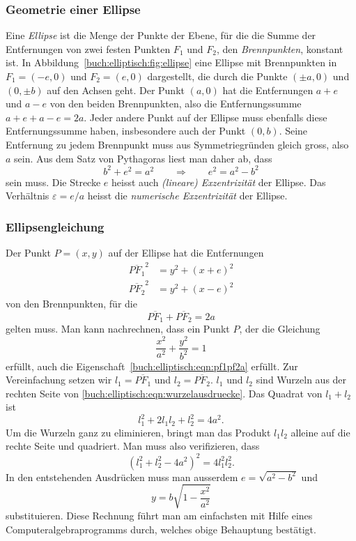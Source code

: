 \subsubsection{Geometrie einer Ellipse}
Eine {\em Ellipse} ist die Menge der Punkte der Ebene, für die die Summe
%
der Entfernungen von zwei festen Punkten $F_1$ und $F_2$,
den {\em Brennpunkten}, konstant ist.
%
In Abbildung~\ref{buch:elliptisch:fig:ellipse} eine Ellipse
mit Brennpunkten in $F_1=(-e,0)$ und $F_2=(e,0)$ dargestellt,
die durch die Punkte $(\pm a,0)$ und $(0,\pm b)$ auf den Achsen geht.
Der Punkt $(a,0)$ hat die Entfernungen $a+e$ und $a-e$ von den beiden
Brennpunkten, also die Entfernungssumme $a+e+a-e=2a$.
Jeder andere Punkt auf der Ellipse muss ebenfalls diese Entfernungssumme
haben, insbesondere auch der Punkt $(0,b)$.
Seine Entfernung zu jedem Brennpunkt muss aus Symmetriegründen gleich gross,
also $a$ sein.
Aus dem Satz von Pythagoras liest man daher ab, dass
\[
b^2+e^2=a^2
\qquad\Rightarrow\qquad
e^2 = a^2-b^2
\]
sein muss.
Die Strecke $e$ heisst auch {\em (lineare) Exzentrizität} der Ellipse.
Das Verhältnis $\varepsilon= e/a$  heisst die {\em numerische Exzentrizität}
der Ellipse.

\subsubsection{Ellipsengleichung}
Der Punkt $P=(x,y)$ auf der Ellipse hat die Entfernungen
\begin{equation}
\begin{aligned}
\overline{PF_1}^2
&=
y^2 + (x+e)^2
\\
\overline{PF_2}^2
&=
y^2 + (x-e)^2
\end{aligned}
\label{buch:elliptisch:eqn:wurzelausdruecke}
\end{equation}
von den Brennpunkten, für die 
\begin{equation}
\overline{PF_1}+\overline{PF_2}
=
2a
\label{buch:elliptisch:eqn:pf1pf2a}
\end{equation}
gelten muss.
Man kann nachrechnen, dass ein Punkt $P$, der die Gleichung
\[
\frac{x^2}{a^2} + \frac{y^2}{b^2}=1
\]
erfüllt, auch die Eigenschaft~\eqref{buch:elliptisch:eqn:pf1pf2a}
erfüllt.
Zur Vereinfachung setzen wir $l_1=\overline{PF_1}$ und $l_2=\overline{PF_2}$.
$l_1$ und $l_2$ sind Wurzeln aus der rechten Seite von
\eqref{buch:elliptisch:eqn:wurzelausdruecke}.
Das Quadrat von $l_1+l_2$ ist
\[
l_1^2 + 2l_1l_2 + l_2^2 = 4a^2.
\]
Um die Wurzeln ganz zu eliminieren, bringt man das Produkt $l_1l_2$ alleine
auf die rechte Seite und quadriert.
Man muss also verifizieren, dass
\[
(l_1^2 + l_2^2 -4a^2)^2 = 4l_1^2l_2^2.
\]
In den entstehenden Ausdrücken muss man ausserdem $e=\sqrt{a^2-b^2}$ und
\[
y=b\sqrt{1-\frac{x^2}{a^2}}
\]
substituieren.
Diese Rechnung führt man am einfachsten mit Hilfe eines
Computeralgebraprogramms durch, welches obige Behauptung bestätigt.

